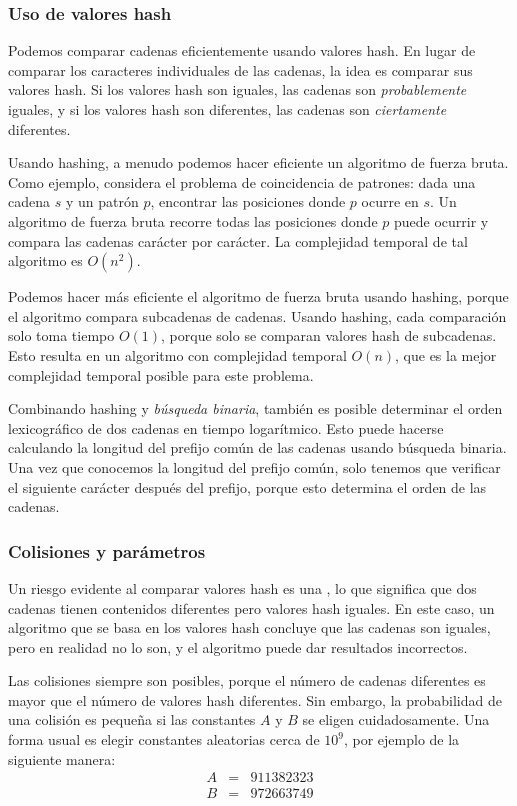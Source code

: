 \subsubsection*{Uso de valores hash}

Podemos comparar cadenas eficientemente usando valores hash.
En lugar de comparar los caracteres individuales de las cadenas,
la idea es comparar sus valores hash.
Si los valores hash son iguales,
las cadenas son \emph{probablemente} iguales,
y si los valores hash son diferentes,
las cadenas son \emph{ciertamente} diferentes.

Usando hashing, a menudo podemos hacer eficiente un algoritmo
de fuerza bruta.
Como ejemplo, considera el problema de coincidencia de patrones:
dada una cadena $s$ y un patrón $p$,
encontrar las posiciones donde $p$ ocurre en $s$.
Un algoritmo de fuerza bruta recorre todas las posiciones
donde $p$ puede ocurrir y compara las cadenas
carácter por carácter.
La complejidad temporal de tal algoritmo es $O(n^2)$.

Podemos hacer más eficiente el algoritmo de fuerza bruta
usando hashing, porque el algoritmo compara
subcadenas de cadenas.
Usando hashing, cada comparación solo toma tiempo $O(1)$,
porque solo se comparan valores hash de subcadenas.
Esto resulta en un algoritmo con complejidad temporal $O(n)$,
que es la mejor complejidad temporal posible para este problema.

Combinando hashing y \emph{búsqueda binaria},
también es posible determinar el orden lexicográfico de
dos cadenas en tiempo logarítmico.
Esto puede hacerse calculando la longitud
del prefijo común de las cadenas usando búsqueda binaria.
Una vez que conocemos la longitud del prefijo común,
solo tenemos que verificar el siguiente carácter después del prefijo,
porque esto determina el orden de las cadenas.

\subsubsection*{Colisiones y parámetros}


Un riesgo evidente al comparar valores hash es
una , lo que significa que dos cadenas tienen
contenidos diferentes pero valores hash iguales.
En este caso, un algoritmo que se basa en
los valores hash concluye que las cadenas son iguales,
pero en realidad no lo son,
y el algoritmo puede dar resultados incorrectos.

Las colisiones siempre son posibles,
porque el número de cadenas diferentes es mayor
que el número de valores hash diferentes.
Sin embargo, la probabilidad de una colisión es pequeña
si las constantes $A$ y $B$ se eligen cuidadosamente.
Una forma usual es elegir constantes aleatorias
cerca de $10^9$, por ejemplo de la siguiente manera:
\[
\begin{array}{lcl}
A & = & 911382323 \\
B & = & 972663749 \\
\end{array}
\]

